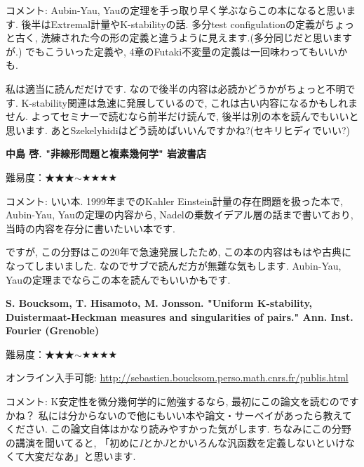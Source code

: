 コメント: Aubin-Yau, Yauの定理を手っ取り早く学ぶならこの本になると思います. 後半はExtremal計量やK-stabilityの話. 多分test configulationの定義がちょっと古く, 洗練された今の形の定義と違うように見えます.(多分同じだと思いますが.) でもこういった定義や, 4章のFutaki不変量の定義は一回味わってもいいかも. 

私は適当に読んだだけです. なので後半の内容は必読かどうかがちょっと不明です. K-stability関連は急速に発展しているので, これは古い内容になるかもしれません. 
よってセミナーで読むなら前半だけ読んで, 後半は別の本を読んでもいいと思います. 
あとSzekelyhidiはどう読めばいいんですかね?(セキリヒディでいい?)
\vspace{8pt}

\textbf{中島 啓. "非線形問題と複素幾何学" 岩波書店}  \vspace{-6pt} 

難易度：★★★$\sim$★★★★ \vspace{-6pt} 

コメント: いい本. 1999年までのKahler Einstein計量の存在問題を扱った本で, Aubin-Yau, Yauの定理の内容から, Nadelの乗数イデアル層の話まで書いており, 当時の内容を存分に書いたいい本です.

ですが, この分野はこの20年で急速発展したため, この本の内容はもはや古典になってしまいました. 
なのでサブで読んだ方が無難な気もします. Aubin-Yau, Yauの定理までならこの本を読んでもいいかもです.
\vspace{8pt}

\textbf{S. Boucksom, T. Hisamoto, M. Jonsson. "Uniform K-stability, Duistermaat-Heckman measures and singularities of pairs." Ann. Inst. Fourier (Grenoble)}  \vspace{-6pt} 

難易度：★★★$\sim$★★★★ \vspace{-6pt} 

オンライン入手可能: \url{http://sebastien.boucksom.perso.math.cnrs.fr/publis.html}

コメント: K安定性を微分幾何学的に勉強するなら, 最初にこの論文を読むのですかね？ 私には分からないので他にもいい本や論文・サーベイがあったら教えてください. 
この論文自体はかなり読みやすかった気がします. 
ちなみにこの分野の講演を聞いてると, 「初めに$I$とか$J$とかいろんな汎函数を定義しないといけなくて大変だなあ」と思います. 

